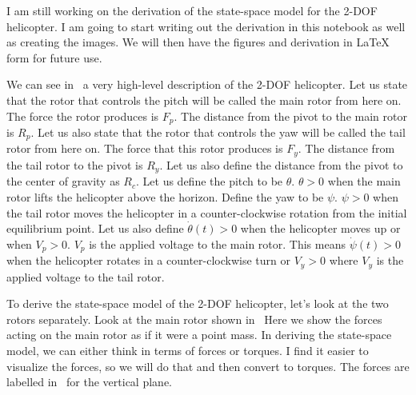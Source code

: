 \documentclass[fontsize=11pt, %
                             paper=letter, %
                             twoside, %
                             captions=tableheading,
                             index=totoc,
                             hyperref]{labbook}
\begin{document}
\begin{addmargin}[0cm]{0cm}
I am still working on the derivation of the state-space model for the 2-DOF helicopter. I am going to start writing out the derivation in this notebook as well as creating the images. We will then have the figures and derivation in LaTeX form for future use.


We can see in~%
a very high-level description of the 2-DOF helicopter. Let us state that the rotor that controls the pitch will be called the main rotor from here on. The force the rotor produces is $F_p$. The distance from the pivot to the main rotor is $R_p$. Let us also state that the rotor that controls the yaw will be called the tail rotor from here on. The force that this rotor produces is $F_y$. The distance from the tail rotor to the pivot is $R_y$. Let us also define the distance from the pivot to the center of gravity as $R_c$.
\bigbreak \noindent
Let us define the pitch to be $\theta$. $\theta > 0$ when the main rotor lifts the helicopter above the horizon. Define the yaw to be $\psi$. $\psi > 0$ when the tail rotor moves the helicopter in a counter-clockwise rotation from the initial equilibrium point. Let us also define $\dot{\theta}(t) > 0$ when the helicopter moves up or when $V_p > 0$. $V_p$ is the applied voltage to the main rotor. This means $\dot{\psi}(t) > 0$ when the helicopter rotates in a counter-clockwise turn or $V_y > 0$ where $V_y$ is the applied voltage to the tail rotor. 

To derive the state-space model of the 2-DOF helicopter, let's look at the two rotors separately. Look at the main rotor shown in~%
Here we show the forces acting on the main rotor as if it were a point mass. In deriving the state-space model, we can either think in terms of forces or torques. I find it easier to visualize the forces, so we will do that and then convert to torques. The forces are labelled in~%
for the vertical plane.


\end{addmargin}
\end{document}
